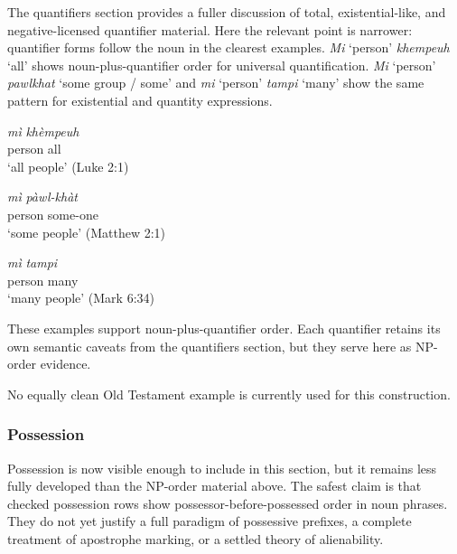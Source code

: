 \documentclass[
  11pt,
  a4paper,
]{article}
\newcommand{\tdim}[1]{\textit{#1}}
\newcommand{\tdimword}[1]{\textit{#1}}
\newcommand{\glossquote}[1]{`#1'}
\begin{document}
The quantifiers section provides a fuller discussion of total,
existential-like, and negative-licensed quantifier material. Here the
relevant point is narrower: quantifier forms follow the noun in the
clearest examples. \tdim{Mi} \glossquote{person} \tdim{khempeuh}
\glossquote{all} shows noun-plus-quantifier order for universal
quantification. \tdim{Mi} \glossquote{person} \tdim{pawlkhat}
\glossquote{some group / some} and \tdim{mi} \glossquote{person}
\tdim{tampi} \glossquote{many} show the same pattern for existential and
quantity expressions.

\begin{exe}
\ex \label{ex:np-mi-khempeuh}
\gll \tdimword{mì} \tdimword{khèmpeuh} \\
     person all \\
\glt \glossquote{all people} (Luke 2:1)
\end{exe}

\begin{exe}
\ex \label{ex:np-mi-pawlkhat}
\gll \tdimword{mì} \tdimword{pàwl-khàt} \\
     person some-one \\
\glt \glossquote{some people} (Matthew 2:1)
\end{exe}

\begin{exe}
\ex \label{ex:np-mi-tampi}
\gll \tdimword{mì} \tdimword{tampi} \\
     person many \\
\glt \glossquote{many people} (Mark 6:34)
\end{exe}

These examples support noun-plus-quantifier order. Each quantifier
retains its own semantic caveats from the quantifiers section, but they
serve here as NP-order evidence.

No equally clean Old Testament example is currently used for this
construction.

\subsubsection{Possession}\label{possession}

Possession is now visible enough to include in this section, but it
remains less fully developed than the NP-order material above. The
safest claim is that checked possession rows show
possessor-before-possessed order in noun phrases. They do not yet
justify a full paradigm of possessive prefixes, a complete treatment of
apostrophe marking, or a settled theory of alienability.
\end{document}
